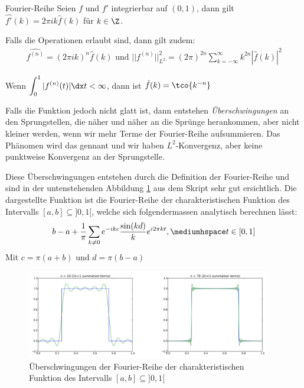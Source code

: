\begin{theorem}[]{Fourier-Reihe}
    Seien $f$ und $f'$ integrierbar auf $(0, 1)$, dann gilt $\hat{f'}(k) = 2\pi ik\hat{f}(k)$ für $k \in \Z$.

    Falls die Operationen erlaubt sind, dann gilt zudem:
    \rmvspace
    \begin{align*}
        \hat{f^{(n)}} = (2\pi ik)^n \hat{f}(k) \text{ und } ||f^{(n)}||_{L^2}^2 = (2\pi)^{2n} \sum_{k = -\infty}^{\infty} k^{2n} |\hat{f}(k)|^2
    \end{align*}
\end{theorem}


\inlinetheorem Wenn $\displaystyle \int_{0}^{1} |f^{(n)}(t)|\dx t < \infty$, dann ist $\hat{f}(k) = \tco{k^{-n}}$

Falls die Funktion jedoch nicht glatt ist, dann entstehen \textit{Überschwingungen} an den Sprungstellen, die näher und näher an die Sprünge herankommen, aber nicht kleiner werden, wenn wir mehr Terme der Fourier-Reihe aufsummieren.
Das Phänomen wird das  gennant und wir haben $L^2$-Konvergenz, aber keine punktweise Konvergenz an der Sprungstelle.

\inlineremark
Diese Überschwingungen entstehen durch die Definition der Fourier-Reihe und sind in der untenstehenden Abbildung \ref{fig:trigo-interp-overarcing} aus dem Skript sehr gut ersichtlich.
Die dargestellte Funktion ist die Fourier-Reihe der charakteristischen Funktion des Intervalls $[a, b] \subseteq ]0, 1[$, welche sich folgendermassen analytisch berechnen lässt:
\begin{align*}
    b - a + \frac{1}{\pi} \sum_{k \neq 0} e^{-ikc}\frac{\sin(kd)}{k} e^{i2\pi kt}, \mediumhspace t \in [0, 1]
\end{align*}
Mit $c = \pi(a + b)$ und $d = \pi(b - a)$

\begin{figure}[h!]
    \begin{center}
        \includegraphics[width=0.95\textwidth]{assets/01_interpolation/01_trigonometric/overarcing.png}
    \end{center}
    \caption{Überschwingungen der Fourier-Reihe der charakteristischen Funktion des Intervalls $[a, b] \subseteq ]0, 1[$}
    \label{fig:trigo-interp-overarcing}
\end{figure}

